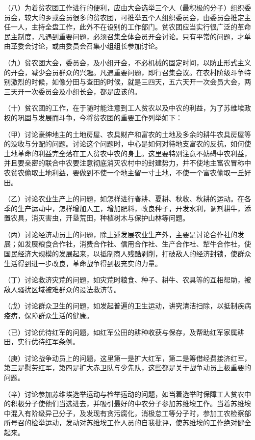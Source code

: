 （八）为着贫农团工作进行的便利，应由大会选举三个人（最积极的分子）组织委员会，较大的乡或会员很多的贫农团，可推举五个人组织委员会，由委员会推定主任一人，主持全盘工作，此外不在设别的工作部门。贫农团应当实行很广泛的革命民主制度，凡遇到重要问题，必须召集全体会员开会讨论。只有平常的问题，才单由革委会讨论，或由委员会召集小组组长参加讨论。

（九）贫农团大会，委员会，及小组开会，不必机械的固定时间，以防止形式主义的开会，减少会员群众的兴趣。凡遇重要问题，即行召集会议。在农村阶级斗争特别激烈的时候，如像分田与查田的时候，就是三四天，五六天开一次会员大会，两三天开一次委员会及小组长会，都是应该的。

（十）贫农团的工作，在于随时能注意到工人贫农以及中农的利益，为了苏维埃政权的巩固与发展而斗争，今将贫农团的重要工作列举如下：

（甲）讨论豪绅地主的土地房屋、农具财产和富农的土地及多余的耕牛农具房屋等的没收与分配的问题。讨论这个问题时，中心是如何对待地支富农的反抗，如何使土地革命的利益完全落在工人贫农中农的身上。这里要特别注意不妨碍中农利益，并且要亲密的联合中农要注意彻底消灭农村中的封建势力，并不使地主富农冒称中农贫农偷取土地利益，要做到不使一个地主留一寸土地，不使一个富农偷取一丘好田。

（乙）讨论农业生产上的问题，如怎样进行春耕、夏耕、秋收、秋耕的运动。在各季的生产运动中，怎样增加人工，增加肥料，改良种子，开发水利，调剂耕牛，添置农具，消灭害虫，开垦荒田，种植树木与保护山林等问题。

（丙）讨论经济动员上的问题，除上述发展农业生产外，主要是讨论合作社的发展；如发展粮食合作社，消费合作社、信用合作社、生产合作社、犁牛合作社，使国民经济大规模的发展起来，以抵制商人残酷剥削，打破敌人的经济封锁，使群众生活得到进一步改良，革命战争得到极充实的力量。

（丁）讨论救济灾荒的问题，如灾荒时粮食、种子、耕牛、农具等的互相帮助，被敌人骚扰区域被难群众的设法救济等。

（戊）讨论群众卫生的问题，如发起普遍的卫生运动，讲究清洁扫除，以抵制疾病疫疠，保障群众生活的健康。

（已）讨论优待红军的问题，如红军公田的耕种收获与保存，及帮助红军家属耕田，实行优待红军条例。

（庚）讨论战争动员上的问题，这里第一是扩大红军，第二是筹借经费接济红军，第三是慰劳红军，第四是扩大赤卫队与少先队，这些都是关于战争动员上极重要的问题。

（辛）讨论参加苏维埃选举运动与检举运动的问题，如当着选举时保障工人贫农中的积极分子使他们当选进去，并吸引最好的中农分子参加苏维埃工作。当着苏维埃中混入有阶级异己分子，及发现有贪污腐化，消极怠工等分子时，参加工农检察部所号召的检举运动，发动对苏维埃工作人员的自我批评，使苏维埃的工作绝对健全起来。

